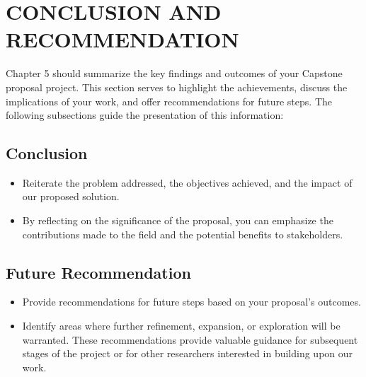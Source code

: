\chapter{CONCLUSION AND RECOMMENDATION}

Chapter 5 should summarize the key findings and outcomes of your Capstone proposal project. This section serves to highlight the achievements, discuss the implications of your work, and offer recommendations for future steps. The following subsections guide the presentation of this information:

\section{Conclusion}
\begin{itemize}
\item Reiterate the problem addressed, the objectives achieved, and the impact of our proposed solution.
\item By reflecting on the significance of the proposal, you can emphasize the
contributions made to the field and the potential benefits to stakeholders.
\end{itemize}


\section{Future Recommendation}
\begin{itemize}
\item Provide recommendations for future steps based on your proposal’s outcomes.
\item Identify areas where further refinement, expansion, or exploration will be
warranted. These recommendations provide valuable guidance for subsequent
stages of the project or for other researchers interested in building upon our work.
\end{itemize}
